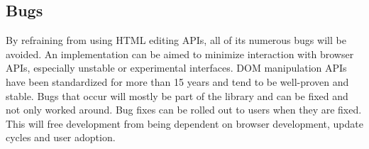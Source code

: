 \subsection{Bugs} %

By refraining from using HTML editing APIs, all of its numerous bugs will be avoided. An implementation can be aimed to minimize interaction with browser APIs, especially unstable or experimental interfaces. DOM manipulation APIs have been standardized for more than 15 years and tend to be well-proven and stable. Bugs that occur will mostly be part of the library and can be fixed and not only worked around. Bug fixes can be rolled out to users when they are fixed. This will free development from being dependent on browser development, update cycles and user adoption. 






